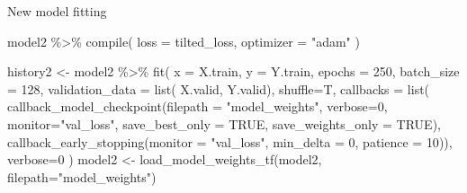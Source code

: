 \documentclass[
  ignorenonframetext,
]{beamer}
\newenvironment{Shaded}{\begin{snugshade}}{\end{snugshade}}
\newcommand{\AttributeTok}[1]{\textcolor[rgb]{0.77,0.63,0.00}{#1}}
\newcommand{\ConstantTok}[1]{\textcolor[rgb]{0.00,0.00,0.00}{#1}}
\newcommand{\DecValTok}[1]{\textcolor[rgb]{0.00,0.00,0.81}{#1}}
\newcommand{\FunctionTok}[1]{\textcolor[rgb]{0.00,0.00,0.00}{#1}}
\newcommand{\NormalTok}[1]{#1}
\newcommand{\OtherTok}[1]{\textcolor[rgb]{0.56,0.35,0.01}{#1}}
\newcommand{\SpecialCharTok}[1]{\textcolor[rgb]{0.00,0.00,0.00}{#1}}
\newcommand{\StringTok}[1]{\textcolor[rgb]{0.31,0.60,0.02}{#1}}
\begin{document}
\begin{frame}[fragile]{New model fitting}
\protect\hypertarget{new-model-fitting}{}
\begin{Shaded}
\begin{Highlighting}[]
\NormalTok{model2 }\SpecialCharTok{\%\textgreater{}\%} \FunctionTok{compile}\NormalTok{(}
  \AttributeTok{loss =}\NormalTok{ tilted\_loss,}
  \AttributeTok{optimizer =} \StringTok{"adam"}
\NormalTok{)}
\end{Highlighting}
\end{Shaded}

\begin{Shaded}
\begin{Highlighting}[]
\NormalTok{history2 }\OtherTok{\textless{}{-}}\NormalTok{ model2 }\SpecialCharTok{\%\textgreater{}\%} \FunctionTok{fit}\NormalTok{(}
  \AttributeTok{x =}\NormalTok{ X.train, }\AttributeTok{y =}\NormalTok{ Y.train,}
  \AttributeTok{epochs =} \DecValTok{250}\NormalTok{, }\AttributeTok{batch\_size =} \DecValTok{128}\NormalTok{, }
  \AttributeTok{validation\_data =} \FunctionTok{list}\NormalTok{(}
\NormalTok{    X.valid, Y.valid),}
  \AttributeTok{shuffle=}\NormalTok{T,}
 \AttributeTok{callbacks =}  \FunctionTok{list}\NormalTok{(}
    \FunctionTok{callback\_model\_checkpoint}\NormalTok{(}\AttributeTok{filepath =} \StringTok{"model\_weights"}\NormalTok{,}
      \AttributeTok{verbose=}\DecValTok{0}\NormalTok{, }\AttributeTok{monitor=}\StringTok{"val\_loss"}\NormalTok{,}
      \AttributeTok{save\_best\_only =} \ConstantTok{TRUE}\NormalTok{, }\AttributeTok{save\_weights\_only =} \ConstantTok{TRUE}\NormalTok{),}
      \FunctionTok{callback\_early\_stopping}\NormalTok{(}\AttributeTok{monitor =} \StringTok{"val\_loss"}\NormalTok{, }
                          \AttributeTok{min\_delta =} \DecValTok{0}\NormalTok{, }\AttributeTok{patience =} \DecValTok{10}\NormalTok{)),}
    \AttributeTok{verbose=}\DecValTok{0}
\NormalTok{)}
\NormalTok{model2 }\OtherTok{\textless{}{-}} \FunctionTok{load\_model\_weights\_tf}\NormalTok{(model2,}
                               \AttributeTok{filepath=}\StringTok{"model\_weights"}\NormalTok{)}
\end{Highlighting}
\end{Shaded}
\end{frame}
\end{document}
